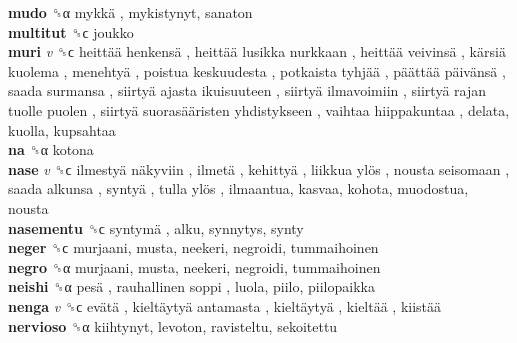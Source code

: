 \textbf{mudo} ␝α   mykkä , mykistynyt, sanaton  \\
\textbf{multitut} ␝ϲ  joukko  \\
\textbf{muri} \emph{v}  ␝ϲ   heittää henkensä ,  heittää lusikka nurkkaan ,  heittää veivinsä ,  kärsiä kuolema ,  menehtyä ,  poistua keskuudesta ,  potkaista tyhjää ,  päättää päivänsä ,  saada surmansa ,  siirtyä ajasta ikuisuuteen ,  siirtyä ilmavoimiin ,  siirtyä rajan tuolle puolen ,  siirtyä suorasääristen yhdistykseen ,  vaihtaa hiippakuntaa , delata, kuolla, kupsahtaa  \\
\textbf{na} ␝α  kotona  \\
\textbf{nase} \emph{v}  ␝ϲ   ilmestyä näkyviin ,  ilmetä ,  kehittyä ,  liikkua ylös ,  nousta seisomaan ,  saada alkunsa ,  syntyä ,  tulla ylös , ilmaantua, kasvaa, kohota, muodostua, nousta  \\
\textbf{nasementu} ␝ϲ   syntymä , alku, synnytys, synty  \\
\textbf{neger} ␝ϲ  murjaani, musta, neekeri, negroidi, tummaihoinen  \\
\textbf{negro} ␝α  murjaani, musta, neekeri, negroidi, tummaihoinen  \\
\textbf{neishi} ␝α   pesä ,  rauhallinen soppi , luola, piilo, piilopaikka  \\
\textbf{nenga} \emph{v}  ␝ϲ   evätä ,  kieltäytyä antamasta ,  kieltäytyä ,  kieltää ,  kiistää   \\
\textbf{nervioso} ␝α  kiihtynyt, levoton, ravisteltu, sekoitettu  \\
